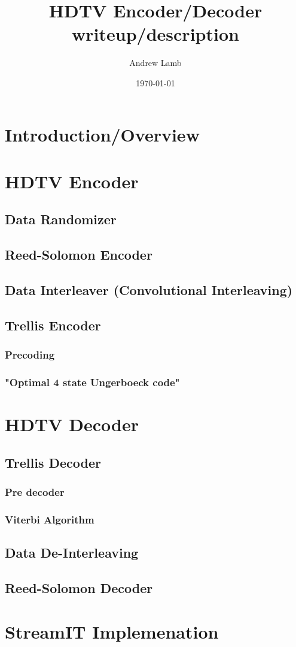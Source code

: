 \documentclass{article}
\title{HDTV Encoder/Decoder writeup/description}
\author{Andrew Lamb}
\date{\today}
\begin{document}
\maketitle
\newpage

\section{Introduction/Overview}

\section{HDTV Encoder}
\subsection{Data Randomizer}

\subsection{Reed-Solomon Encoder}

\subsection{Data Interleaver (Convolutional Interleaving)}

\subsection{Trellis Encoder}
\subsubsection{Precoding}
\subsubsection{"Optimal 4 state Ungerboeck code"}


\section{HDTV Decoder}
\subsection{Trellis Decoder}
\subsubsection{Pre decoder}
\subsubsection{Viterbi Algorithm}


\subsection{Data De-Interleaving}


\subsection{Reed-Solomon Decoder}



\section{StreamIT Implemenation}
\end{document}
